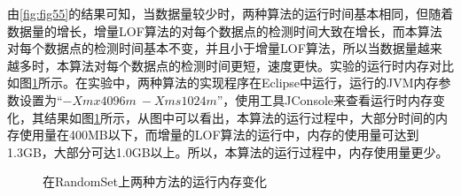 由\ref{fig:fig55}的结果可知，当数据量较少时，两种算法的运行时间基本相同，但随着数据量的增长，增量LOF算法的对每个数据点的检测时间大致在增长，而本算法对每个数据点的检测时间基本不变，并且小于增量LOF算法，所以当数据量越来越多时，本算法对每个数据点的检测时间更短，速度更快。实验的运行时内存对比如图\ref{fig:fig567}所示。在实验中，两种算法的实现程序在Eclipse中运行，运行的JVM内存参数设置为“$-Xmx4096m\  -Xms1024m$”，使用工具JConsole来查看运行时内存变化，其结果如图\ref{fig:fig567}所示，从图中可以看出，本算法的运行过程中，大部分时间的内存使用量在400MB以下，而增量的LOF算法的运行中，内存的使用量可达到1.3GB，大部分可达1.0GB以上。所以，本算法的运行过程中，内存使用量更少。

\begin{figure}[htbp]
	\centering                                      %
	\caption{在RandomSet上两种方法的运行内存变化} %
	\label{fig:fig567}                                       %
\end{figure}

